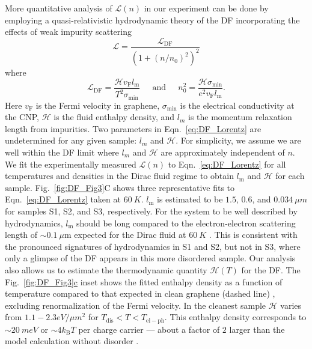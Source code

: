 More quantitative analysis of $\mathcal{L}(n)$ in our experiment can be done by employing a quasi-relativistic hydrodynamic theory of the DF incorporating the effects of weak impurity scattering \cite{hartnoll_theory_2007, muller_quantum-critical_2008, foster_slow_2009}
\begin{equation}
\label{eq:DF_Lorentz}
 \mathcal{L} =  \frac{\mathcal{L}_{\mathrm{DF}}}{\left(1+(n/n_0)^2\right)^2}
 \end{equation}
 where 
\begin{equation}
\mathcal{L}_{\mathrm{DF}} = \frac{\mathcal{H}v_{\mathrm{F}}l_{\mathrm{m}}}{T^2 \sigma_{\mathrm{min}}} \;\;\;\; \textrm{~and~} \;\;\;\; n_0^2 = \frac{\mathcal{H}\sigma_{\mathrm{min}}}{e^2v_{\mathrm{F}}l_{\mathrm{m}}}.
\end{equation}
Here $v_{\mathrm{F}}$ is the Fermi velocity in graphene, $\sigma_{\mathrm{min}}$ is the electrical conductivity at the CNP, $\mathcal{H}$ is the fluid enthalpy density, and $l_m$ is the momentum relaxation length from impurities. Two parameters in Eqn.~\ref{eq:DF_Lorentz} are undetermined for any given sample: $l_m$ and  $\mathcal{H}$.  For simplicity, we assume we are well within the DF limit where $l_m$ and $\mathcal{H}$ are approximately independent of $n$. We fit the experimentally measured $\mathcal{L}(n)$ to Eqn.~\ref{eq:DF_Lorentz} for all temperatures and densities in the Dirac fluid regime to obtain $l_{\mathrm{m}}$ and $\mathcal{H}$  for each sample.  Fig.~\ref{fig:DF_Fig3}C shows three representative fits to Eqn.~\ref{eq:DF_Lorentz} taken at $60~K$. $l_{\mathrm{m}}$ is estimated to be $1.5$, $0.6$, and $0.034~\mu m$ for samples S1, S2, and S3, respectively.  For the system to be well described by hydrodynamics, $l_{\mathrm{m}}$ should be long compared to the electron-electron scattering length of $\sim 0.1~\mu$m expected for the Dirac fluid at $60~K$ \cite{muller_graphene:_2009}.  This is consistent with the pronounced signatures of hydrodynamics in S1 and S2, but not in S3, where only a glimpse of the DF appears in this more disordered sample. Our analysis also allows us to estimate the thermodynamic quantity $\mathcal{H}(T)$ for the DF. The Fig.~\hyperref[fig:DF_Fig3]{\ref*{fig:DF_Fig3}c} inset shows the fitted enthalpy density as a function of temperature compared to that expected in clean graphene (dashed line) \cite{muller_graphene:_2009}, excluding renormalization of the Fermi velocity. In the cleanest sample $\mathcal{H}$ varies from $1.1-2.3 eV/\mu m^2$ for $T_{\mathrm{dis}}<T<T_{\mathrm{el-ph}}$.   This enthalpy density corresponds to  $\sim 20~meV$ or $\sim4k_{\mathrm{B}}T$ per charge carrier --- about a factor of $2$ larger than the model calculation without disorder \cite{muller_graphene:_2009}.  

